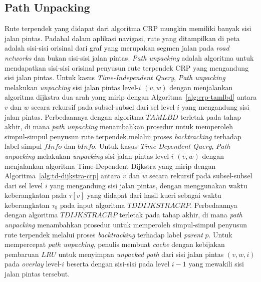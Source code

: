 \subsection{Path Unpacking}
\label{subsec:tdcrp-path-unpacking}
Rute terpendek yang didapat dari algoritma CRP mungkin memiliki banyak sisi jalan pintas. Padahal dalam aplikasi navigasi, rute yang ditampilkan di peta adalah sisi-sisi orisinal dari graf yang merupakan segmen jalan pada \textit{road networks} dan bukan sisi-sisi jalan pintas. \textit{Path unpacking} adalah algoritma untuk mendapatkan sisi-sisi orisinal penyusun rute terpendek CRP yang mengandung sisi jalan pintas. Untuk kasus \textit{Time-Independent Query}, \textit{Path unpacking} melakukan \textit{unpacking} sisi jalan pintas level-$i$ $(v,w)$ dengan menjalankan algoritma dijkstra dua arah yang mirip dengan Algoritma~\ref{alg:crp-tamlbd} antara $v$ dan $w$ secara rekursif pada subsel-subsel dari sel level $i$ yang mengandung sisi jalan pintas. Perbedaannya dengan algoritma $TAMLBD$ terletak pada tahap akhir, di mana \textit{path unpacking} menambahkan prosedur untuk memperoleh simpul-simpul penyusun rute terpendek melalui proses \textit{backtracking} terhadap label simpul $fInfo$ dan $bInfo$. Untuk kasus \textit{Time-Dependent Query}, \textit{Path unpacking} melakukan \textit{unpacking} sisi jalan pintas level-$i$ $(v,w)$ dengan menjalankan algoritma Time-Dependent Dijkstra yang mirip dengan Algoritma~\ref{alg:td-dijkstra-crp} antara $v$ dan $w$ secara rekursif pada subsel-subsel dari sel level $i$ yang mengandung sisi jalan pintas, dengan menggunakan waktu keberangkatan pada $\tau[v]$ yang didapat dari hasil kueri sebagai waktu keberangkatan $\tau_0$ pada input algoritma $TDDIJKSTRACRP$. Perbedaannya dengan algoritma $TDIJKSTRACRP$ terletak pada tahap akhir, di mana \textit{path unpacking} menambahkan prosedur untuk memperoleh simpul-simpul penyusun rute terpendek melalui proses \textit{backtracking} terhadap label \textit{parent} $p$. Untuk mempercepat \textit{path unpacking}, penulis membuat \textit{cache} dengan kebijakan pembaruan $LRU$ untuk menyimpan \textit{unpacked path} dari sisi jalan pintas $(v,w,i)$ pada \textit{overlay} level-$i$ beserta dengan sisi-sisi pada level $i-1$ yang mewakili sisi jalan pintas tersebut.


